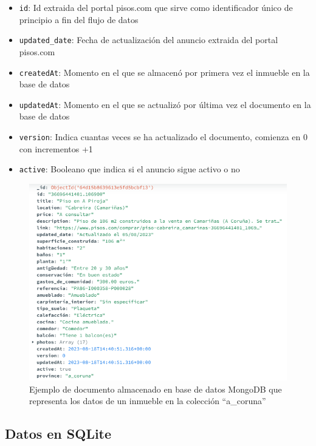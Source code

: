 \begin{itemize}
	\item{\texttt{id}: Id extraida del portal pisos.com que sirve como identificador único de principio a fin del flujo de datos}
    \item{\texttt{updated\_date}: Fecha de actualización del anuncio extraida del portal pisos.com}
    \item{\texttt{createdAt}: Momento en el que se almacenó por primera vez el inmueble en la base de datos}
    \item{\texttt{updatedAt}: Momento en el que se actualizó por última vez el documento en la base de datos}
    \item{\texttt{version}: Indica cuantas veces se ha actualizado el documento, comienza en 0 con incrementos +1}
    \item{\texttt{active}: Booleano que indica si el anuncio sigue activo o no}
\end{itemize}


\begin{figure}[ht]
    \centering
	\includegraphics[width=1\textwidth]{img/documento_mongodb.PNG}
	\caption[Ejemplo de documento almacenado en base de datos MongoDB]{Ejemplo de documento almacenado en base de datos MongoDB que representa los datos de un inmueble en la colección ``a\_coruna''}
	\label{fig:documento_inmueble}
\end{figure}


\subsection{Datos en SQLite}

